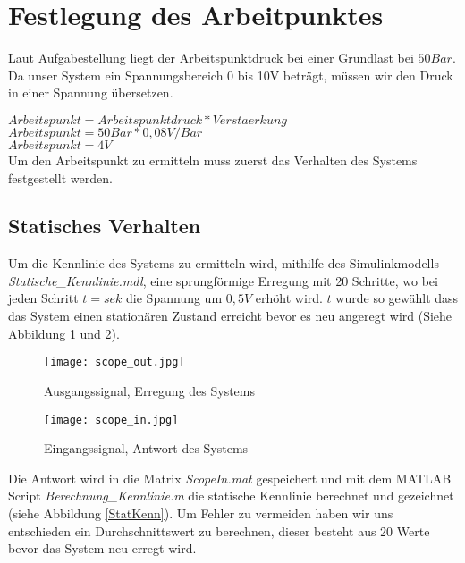 

\newpage
[Hansert]
\section{Festlegung des Arbeitpunktes}

Laut Aufgabestellung liegt der Arbeitspunktdruck bei einer Grundlast bei $50Bar$. Da unser System ein Spannungsbereich 0 bis 10V beträgt, müssen wir den Druck in einer Spannung übersetzen.

$Arbeitspunkt = Arbeitspunktdruck * Verstaerkung$\\
$Arbeitspunkt = 50Bar * 0,08V/Bar$\\
$Arbeitspunkt = 4V$\\ 


Um den Arbeitspunkt zu ermitteln muss zuerst das Verhalten des Systems festgestellt werden.


\subsection{Statisches Verhalten}
Um die Kennlinie des Systems zu ermitteln wird, mithilfe des Simulinkmodells \textit{Statische\_Kennlinie.mdl}, eine sprungförmige Erregung mit 20 Schritte, wo bei jeden Schritt $t= sek$ die Spannung um $0,5V$ erhöht wird. $t$ wurde so gewählt dass das System einen stationären Zustand erreicht bevor es neu angeregt wird (Siehe Abbildung \ref{ScopOut} und \ref{ScopIn}).

\begin{figure}[h]
	\begin{center}
		\texttt{[image: scope\_out.jpg]}
		\caption{Ausgangssignal, Erregung des Systems}
       \label{ScopOut}
	\end{center} 
\end{figure}


\begin{figure}[h]
	\begin{center}
		\texttt{[image: scope\_in.jpg]}
		\caption{Eingangssignal, Antwort des Systems}
       \label{ScopIn}
	\end{center} 
\end{figure}

Die Antwort wird in die Matrix \textit{ScopeIn.mat} gespeichert und mit dem MATLAB Script \textit{Berechnung\_Kennlinie.m} die statische Kennlinie berechnet und gezeichnet (siehe Abbildung \ref{StatKenn}). Um Fehler zu vermeiden haben wir uns entschieden ein Durchschnittswert zu berechnen, dieser besteht aus 20 Werte bevor das System neu erregt wird.



